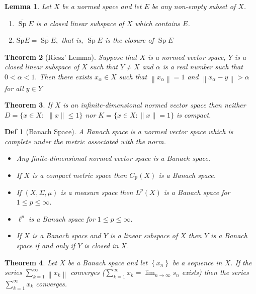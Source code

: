 \documentclass[10pt]{paper}
\newtheorem{theorem}{Theorem}[section]
\newtheorem{definition}{Def}[section]
\newtheorem{lemma}[theorem]{Lemma}
\begin{document}
\begin{lemma}
    Let $X$ be a normed space and let $E$ be any non-empty subset of $X$.
    \begin{enumerate}
        \item $\overline{\operatorname{Sp}} E$ is a closed linear subspace of $X$ which contains $E$.
        \item $\overline{\mathrm{Sp}} E=\overline{\operatorname{Sp} E},$ that is, $\overline{\operatorname{Sp}} E$ is the closure of $\operatorname{Sp} E$
    \end{enumerate}
\end{lemma}

\begin{theorem}[Riesz’ Lemma]
    Suppose that $X$ is a normed vector space, $Y$ is a closed linear subspace of $X$ such that $Y \neq X$ and $\alpha$ is a real number such that $0<\alpha<1 .$ Then there exists $x_{\alpha} \in X$ such that $\left\|x_{\alpha}\right\|=1$ and $\left\|x_{\alpha}-y\right\|>\alpha$ for all $y \in Y$
\end{theorem}

\begin{theorem}
    If $X$ is an infinite-dimensional normed vector space then neither $D=\{x \in X:$ $\|x\| \leq 1\}$ nor $K=\{x \in X:\|x\|=1\}$ is compact.
\end{theorem}

\begin{definition}[Banach Space]
    A Banach space is a normed vector space which is complete under the metric
    associated with the norm.

    \begin{itemize}
        \item Any finite-dimensional normed vector space is a Banach space.
        \item If $X$ is a compact metric space then $C_{\mathrm{F}}(X)$ is a Banach space.
        \item If $(X, \Sigma, \mu)$ is a measure space then $L^{p}(X)$ is a Banach space for $1 \leq p \leq \infty$.
        \item $\ell^{p}$ is a Banach space for $1 \leq p \leq \infty$.
        \item If $X$ is a Banach space and $Y$ is a linear subspace of $X$ then $Y$ is a Banach space if and only if $Y$ is closed in $X$.
    \end{itemize}
\end{definition}

\begin{theorem}
    Let $X$ be a Banach space and let $\left\{x_{n}\right\}$ be a sequence in $X$. If the series $\sum_{k=1}^{\infty}\left\|x_{k}\right\|$ converges ($\sum_{k=1}^{\infty} x_{k}=\lim _{n \rightarrow \infty} s_{n}$ exists) then the series $\sum_{k=1}^{\infty} x_{k}$ converges.
\end{theorem}
\end{document}
